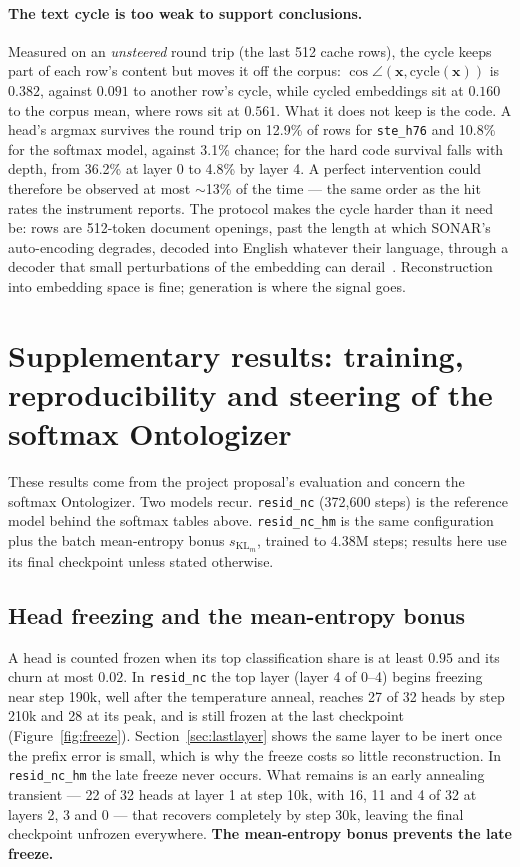 \paragraph{The text cycle is too weak to support conclusions.} Measured on
an \emph{unsteered} round trip (the last 512 cache rows), the cycle
keeps part of each row's content but moves it off the corpus:
$\cos\angle(\mathbf{x}, \mathrm{cycle}(\mathbf{x}))$ is $0.382$, against
$0.091$ to another row's cycle, while cycled embeddings sit at $0.160$ to
the corpus mean, where rows sit at $0.561$. What it does not keep is the
code. A head's argmax survives the round
trip on 12.9\% of rows for \texttt{ste\_h76} and 10.8\% for the softmax
model, against 3.1\% chance; for the hard code survival falls with depth,
from 36.2\% at layer 0 to 4.8\% by layer 4. A
perfect intervention could therefore be observed at most $\sim$13\% of
the time --- the same order as the hit rates the instrument reports. The
protocol makes the cycle harder than it need be: rows are 512-token
document openings, past the length at which SONAR's auto-encoding
degrades, decoded into English whatever their language, through a decoder
that small perturbations of the embedding can derail~\cite{lcmteam2024largeconceptmodelslanguage}.
Reconstruction into embedding space is fine; generation is where the
signal goes.

\section{Supplementary results: training, reproducibility and steering of the softmax Ontologizer}
\label{app:softdyn}

These results come from the project proposal's evaluation and concern the
softmax Ontologizer. Two models recur. \texttt{resid\_nc} (372{,}600 steps)
is the reference model behind the softmax tables above.
\texttt{resid\_nc\_hm} is the same configuration plus the batch
mean-entropy bonus $s_{\mathrm{KL}_m}$, trained to 4.38M steps; results
here use its final checkpoint unless stated otherwise.

\subsection{Head freezing and the mean-entropy bonus}
\label{sec:freeze}

A head is counted frozen when its top classification share is at least
$0.95$ and its churn at most $0.02$. In \texttt{resid\_nc} the top layer
(layer 4 of 0--4) begins freezing near step 190k, well after the
temperature anneal, reaches 27 of 32 heads by step 210k and 28 at its
peak, and is still frozen at the last checkpoint
(Figure~\ref{fig:freeze}). Section~\ref{sec:lastlayer} shows the same
layer to be inert once the prefix error is small, which is why the freeze
costs so little reconstruction. In \texttt{resid\_nc\_hm} the late freeze
never occurs. What remains is an early annealing transient --- 22 of 32
heads at layer 1 at step 10k, with 16, 11 and 4 of 32 at layers 2, 3 and 0
--- that recovers completely by step 30k, leaving the final checkpoint
unfrozen everywhere. \textbf{The mean-entropy bonus prevents the late
freeze.}

